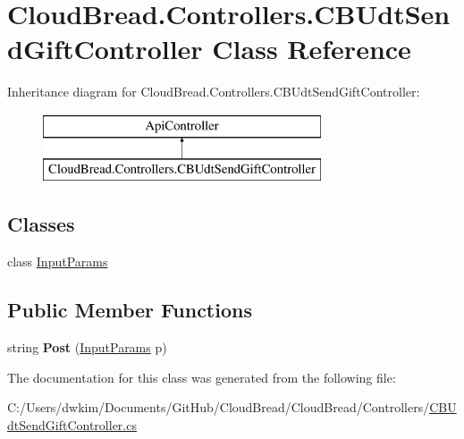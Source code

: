 \hypertarget{class_cloud_bread_1_1_controllers_1_1_c_b_udt_send_gift_controller}{}\section{Cloud\+Bread.\+Controllers.\+C\+B\+Udt\+Send\+Gift\+Controller Class Reference}
\label{class_cloud_bread_1_1_controllers_1_1_c_b_udt_send_gift_controller}
Inheritance diagram for Cloud\+Bread.\+Controllers.\+C\+B\+Udt\+Send\+Gift\+Controller\+:\begin{figure}[H]
\begin{center}
\leavevmode
\includegraphics[height=2.000000cm]{class_cloud_bread_1_1_controllers_1_1_c_b_udt_send_gift_controller}
\end{center}
\end{figure}
\subsection*{Classes}
\begin{DoxyCompactItemize}
\item 
class \hyperlink{class_cloud_bread_1_1_controllers_1_1_c_b_udt_send_gift_controller_1_1_input_params}{Input\+Params}
\end{DoxyCompactItemize}
\subsection*{Public Member Functions}
\begin{DoxyCompactItemize}
\item 
string {\bfseries Post} (\hyperlink{class_cloud_bread_1_1_controllers_1_1_c_b_udt_send_gift_controller_1_1_input_params}{Input\+Params} p)\hypertarget{class_cloud_bread_1_1_controllers_1_1_c_b_udt_send_gift_controller_a4076720fd05860f0eec62024465afdb3}{}\label{class_cloud_bread_1_1_controllers_1_1_c_b_udt_send_gift_controller_a4076720fd05860f0eec62024465afdb3}

\end{DoxyCompactItemize}


The documentation for this class was generated from the following file\+:\begin{DoxyCompactItemize}
\item 
C\+:/\+Users/dwkim/\+Documents/\+Git\+Hub/\+Cloud\+Bread/\+Cloud\+Bread/\+Controllers/\hyperlink{_c_b_udt_send_gift_controller_8cs}{C\+B\+Udt\+Send\+Gift\+Controller.\+cs}\end{DoxyCompactItemize}
